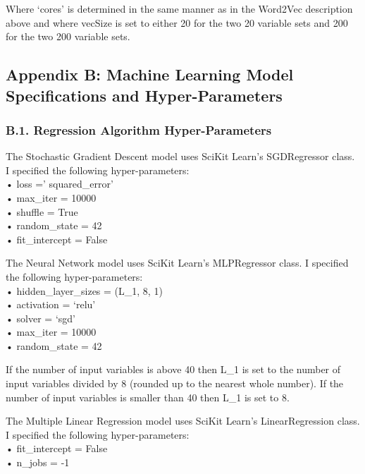 \documentclass[11pt,preprint, authoryear]{elsarticle}
\numberwithin{equation}{section}
\numberwithin{figure}{section}
\numberwithin{table}{section}
\begin{document}
Where `cores' is determined in the same manner as in the Word2Vec
description above and where vecSize is set to either 20 for the two 20
variable sets and 200 for the two 200 variable sets.

\hypertarget{appendix-b-machine-learning-model-specifications-and-hyper-parameters}{%
\subsection*{Appendix B: Machine Learning Model Specifications and
Hyper-Parameters}\label{appendix-b-machine-learning-model-specifications-and-hyper-parameters}}

\hypertarget{b.1.-regression-algorithm-hyper-parameters}{%
\subsubsection*{B.1. Regression Algorithm
Hyper-Parameters}\label{b.1.-regression-algorithm-hyper-parameters}}

The Stochastic Gradient Descent model uses SciKit Learn's SGDRegressor
class. I specified the following hyper-parameters:\\
• loss =' squared\_error'\\
• max\_iter = 10000\\
• shuffle = True\\
• random\_state = 42\\
• fit\_intercept = False

The Neural Network model uses SciKit Learn's MLPRegressor class. I
specified the following hyper-parameters:\\
• hidden\_layer\_sizes = (L\_1, 8, 1)\\
• activation = `relu'\\
• solver = `sgd'\\
• max\_iter = 10000\\
• random\_state = 42

If the number of input variables is above 40 then L\_1 is set to the
number of input variables divided by 8 (rounded up to the nearest whole
number). If the number of input variables is smaller than 40 then L\_1
is set to 8.

The Multiple Linear Regression model uses SciKit Learn's
LinearRegression class. I specified the following hyper-parameters:\\
• fit\_intercept = False\\
• n\_jobs = -1
\end{document}
